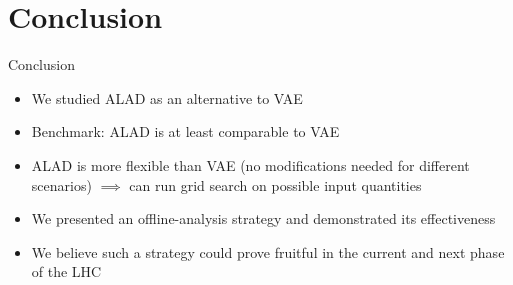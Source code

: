 \documentclass{beamer}
\begin{document}
\section{Conclusion}
\begin{frame}{Conclusion}
  \begin{itemize}
  \item<1-> We studied ALAD as an alternative to VAE
  \item<2-> Benchmark: ALAD is at least comparable to VAE
  \item<3-> ALAD is more flexible than VAE (no modifications needed for different scenarios) $\implies$ can run grid search on possible input quantities
  \item<4-> We presented an offline-analysis strategy and demonstrated its effectiveness
  \item<5-> We believe such a strategy could prove fruitful in the current and next phase of the LHC
  \end{itemize}
\end{frame}
\end{document}
